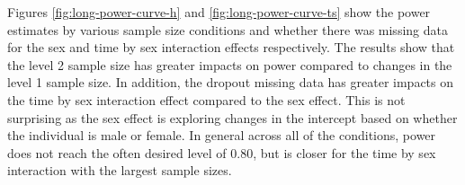 \documentclass[man,mask,floatsintext]{apa6}
\newenvironment{Shaded}{\begin{snugshade}}{\end{snugshade}}
\newcommand{\CharTok}[1]{\textcolor[rgb]{0.31,0.60,0.02}{#1}}
\newcommand{\DataTypeTok}[1]{\textcolor[rgb]{0.13,0.29,0.53}{#1}}
\newcommand{\KeywordTok}[1]{\textcolor[rgb]{0.13,0.29,0.53}{\textbf{#1}}}
\newcommand{\NormalTok}[1]{#1}
\newcommand{\OperatorTok}[1]{\textcolor[rgb]{0.81,0.36,0.00}{\textbf{#1}}}
\newcommand{\OtherTok}[1]{\textcolor[rgb]{0.56,0.35,0.01}{#1}}
\newcommand{\StringTok}[1]{\textcolor[rgb]{0.31,0.60,0.02}{#1}}
\begin{document}
\begin{Shaded}
\end{Shaded}

Figures \ref{fig:long-power-curve-h} and \ref{fig:long-power-curve-ts} show the power estimates by various sample size conditions and whether there was missing data for the sex and time by sex interaction effects respectively. The results show that the level 2 sample size has greater impacts on power compared to changes in the level 1 sample size. In addition, the dropout missing data has greater impacts on the time by sex interaction effect compared to the sex effect. This is not surprising as the sex effect is exploring changes in the intercept based on whether the individual is male or female. In general across all of the conditions, power does not reach the often desired level of 0.80, but is closer for the time by sex interaction with the largest sample sizes.
\end{document}
